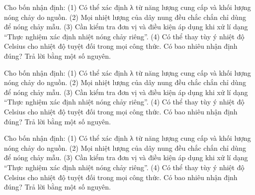 \begin{ex}
Cho bốn nhận định: (1) Có thể xác định λ từ năng lượng cung cấp và khối lượng nóng chảy do nguồn. (2) Mọi nhiệt lượng của dây nung đều chắc chắn chỉ dùng để nóng chảy mẫu. (3) Cần kiểm tra đơn vị và điều kiện áp dụng khi xử lí dạng “Thực nghiệm xác định nhiệt nóng chảy riêng”. (4) Có thể thay tùy ý nhiệt độ Celsius cho nhiệt độ tuyệt đối trong mọi công thức. Có bao nhiêu nhận định đúng? Trả lời bằng một số nguyên.
\end{ex}

\begin{ex}
Cho bốn nhận định: (1) Có thể xác định λ từ năng lượng cung cấp và khối lượng nóng chảy do nguồn. (2) Mọi nhiệt lượng của dây nung đều chắc chắn chỉ dùng để nóng chảy mẫu. (3) Cần kiểm tra đơn vị và điều kiện áp dụng khi xử lí dạng “Thực nghiệm xác định nhiệt nóng chảy riêng”. (4) Có thể thay tùy ý nhiệt độ Celsius cho nhiệt độ tuyệt đối trong mọi công thức. Có bao nhiêu nhận định đúng? Trả lời bằng một số nguyên.
\end{ex}

\begin{ex}
Cho bốn nhận định: (1) Có thể xác định λ từ năng lượng cung cấp và khối lượng nóng chảy do nguồn. (2) Mọi nhiệt lượng của dây nung đều chắc chắn chỉ dùng để nóng chảy mẫu. (3) Cần kiểm tra đơn vị và điều kiện áp dụng khi xử lí dạng “Thực nghiệm xác định nhiệt nóng chảy riêng”. (4) Có thể thay tùy ý nhiệt độ Celsius cho nhiệt độ tuyệt đối trong mọi công thức. Có bao nhiêu nhận định đúng? Trả lời bằng một số nguyên.
\end{ex}
